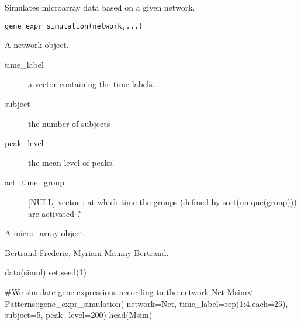 \documentclass[a4paper]{book}
\begin{document}
%
\begin{Description}\relax
Simulates microarray data based on a given network. 
\end{Description}
%
\begin{Usage}
\begin{verbatim}
gene_expr_simulation(network,...)
\end{verbatim}
\end{Usage}
%
\begin{Arguments}
\begin{ldescription}
\item[\code{network}] A network object.
\item[\code{...}] \begin{description}

\item[time\_label] a vector containing the time labels.
\item[subject] the number of subjects
\item[peak\_level] the mean level of peaks. 
\item[act\_time\_group]  [NULL] vector ; at which time the groups (defined by sort(unique(group))) are activated ?

\end{description}

\end{ldescription}
\end{Arguments}
%
\begin{Value}
A micro\_array object.
\end{Value}
%
\begin{Author}\relax
Bertrand Frederic, Myriam Maumy-Bertrand.
\end{Author}
%
\begin{Examples}
\begin{ExampleCode}
data(simul)
set.seed(1)

#We simulate gene expressions according to the network Net
Msim<-Patterns::gene_expr_simulation(
	network=Net,
	time_label=rep(1:4,each=25),
	subject=5,
	peak_level=200)
head(Msim)
\end{ExampleCode}
\end{Examples}
\end{document}
